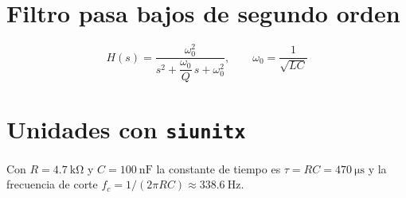 \documentclass[12pt,a4paper]{article}
\begin{document}
\section{Filtro pasa bajos de segundo orden}
\begin{equation}
  H(s) = \frac{\omega_0^{2}}{s^{2} + \dfrac{\omega_0}{Q}\,s + \omega_0^{2}},
  \qquad \omega_0 = \frac{1}{\sqrt{LC}}
\end{equation}

\section{Unidades con \texttt{siunitx}}
Con $R=\SI{4,7}{\kilo\ohm}$ y $C=\SI{100}{\nano\farad}$ la constante de tiempo es
$\tau = RC = \SI{470}{\micro\second}$ y la frecuencia de corte
$f_c = 1/(2\pi RC) \approx \SI{338,6}{\hertz}$.
\end{document}
